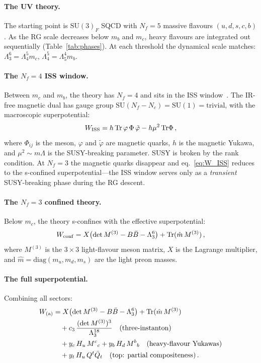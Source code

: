 \documentclass[12pt,a4paper]{article}
\newcommand{\SU}{\mathrm{SU}}
\newcommand{\Nf}{N_{\!f}}
\newcommand{\Nc}{N_{\!c}}
\newcommand{\Tr}{\mathrm{Tr}}
\newcommand{\diag}{\mathrm{diag}}
\begin{document}
\paragraph{The UV theory.}
The starting point is $\SU(3)_F$ SQCD with $\Nf = 5$ massive
flavours $(u,d,s,c,b)$.
As the RG scale decreases below $m_b$ and $m_c$, heavy flavours
are integrated out sequentially (Table~\ref{tab:phases}).
At each threshold the dynamical scale matches:
$\Lambda_3^6 = \Lambda_4^5 m_c$,
$\Lambda_4^5 = \Lambda_5^4 m_b$.

\paragraph{The $\Nf = 4$ ISS window.}
Between $m_c$ and $m_b$, the theory has $\Nf = 4$ and sits in the
ISS window~\cite{ISS:2006}.
The IR-free magnetic dual has gauge group
$\SU(\Nf - \Nc) = \SU(1) = \text{trivial}$, with the macroscopic
superpotential:
\begin{equation}
  W_{\rm ISS} = h\,\Tr\,\varphi\,\Phi\,\tilde\varphi
  - h\mu^2\,\Tr\Phi\,,
  \label{eq:W_ISS}
\end{equation}
where $\Phi_{ij}$ is the meson, $\varphi$ and
$\tilde\varphi$ are magnetic quarks, $h$ is the magnetic Yukawa,
and $\mu^2 \sim m\Lambda$ is the SUSY-breaking parameter.
SUSY is broken by the rank condition.
At $\Nf = 3$ the magnetic quarks disappear and
eq.~\eqref{eq:W_ISS} reduces to the s-confined
superpotential---the ISS window serves only as a \emph{transient}
SUSY-breaking phase during the RG descent.

\paragraph{The $\Nf = 3$ confined theory.}
Below $m_c$, the theory s-confines with the effective
superpotential:
\begin{equation}
  W_{\rm conf} = X\bigl(\det M^{(3)} - B\bar{B} - \Lambda_3^6\bigr)
    + \Tr(\hat{m}\,M^{(3)})\,,
  \label{eq:W_conf}
\end{equation}
where $M^{(3)}$ is the $3 \times 3$ light-flavour meson matrix,
$X$ is the Lagrange multiplier, and
$\hat{m} = \diag(m_u, m_d, m_s)$ are the light preon masses.

\paragraph{The full superpotential.}
Combining all sectors:
\begin{align}
  W_{\rm (a)} &= X\bigl(\det M^{(3)} - B\bar{B} - \Lambda_3^6\bigr)
    + \Tr(\hat{m}\,M^{(3)})
    \nonumber\\
  &\quad + c_3\,\frac{(\det M^{(3)})^3}{\Lambda_3^{18}}
    \quad\text{(three-instanton)}
    \nonumber\\
  &\quad + y_c\,H_u\,M^c{}_c + y_b\,H_d\,M^b{}_b
    \quad\text{(heavy-flavour Yukawas)}
    \nonumber\\
  &\quad + y_t\,H_u\,Q^t\bar{Q}_t
    \quad\text{(top: partial compositeness)}\,.
  \label{eq:W_scenario_a}
\end{align}
\end{document}
